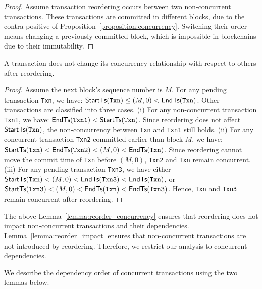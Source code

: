 {\begin{proof} 
  Assume transaction reordering occurs between two non-concurrent transactions.
  These transactions are committed in different blocks, due to the
  contra-positive of Proposition~\ref{proposition:concurrency}. Switching their order means changing a previously committed block, which is impossible in blockchains due
  to their immutability.
\end{proof}

\begin{lemma} 
  \label{lemma:reorder_impact}
  A transaction does not change its concurrency relationship with respect to
  others after reordering.
\end{lemma}

\begin{proof}
  Assume the next block's sequence number is $M$.
  For any pending transaction \texttt{Txn}, we have: $\textsf{StartTs}(\texttt{Txn}) \le (M,0) <
  \textsf{EndTs}(\texttt{Txn})$.
  Other transactions are classified into three cases.
  (i) For any non-concurrent transaction \texttt{Txn1}, we have:
  $\textsf{EndTs}(\texttt{Txn1}) < \textsf{StartTs}(\texttt{Txn})$.
  Since reordering does not affect $\textsf{StartTs}(\texttt{Txn})$, the non-concurrency between
  \texttt{Txn} and \texttt{Txn1} still holds.
  (ii) For any concurrent transaction \texttt{Txn2} committed earlier than block
  $M$, we have: $\textsf{StartTs}(\texttt{Txn}) < \textsf{EndTs}(\texttt{Txn2}) < (M,0) < \textsf{EndTs}(\texttt{Txn})$.
  Since reordering cannot move the commit time of \texttt{Txn} before $(M,0)$,
  \texttt{Txn2} and \texttt{Txn} remain concurrent.
  (iii) For any pending transaction \texttt{Txn3},  we have either $\textsf{StartTs}(\texttt{Txn}) < (M, 0) < \textsf{EndTs}(\texttt{Txn3}) < \textsf{EndTs}(\texttt{Txn})$, or $\textsf{StartTs}(\texttt{Txn3}) < (M, 0) < \textsf{EndTs}(\texttt{Txn}) < \textsf{EndTs}(\texttt{Txn3})$.
  Hence, \texttt{Txn} and \texttt{Txn3} remain concurrent after reordering.
\end{proof}

The above Lemma~\ref{lemma:reorder_concurrency} ensures that reordering does not
impact non-concurrent transactions and their dependencies.
%
Lemma~\ref{lemma:reorder_impact} ensures that non-concurrent transactions are not
introduced by reordering.
%
Therefore, we restrict our analysis to concurrent dependencies.

We describe the dependency order of concurrent transactions using the two lemmas below.

}
